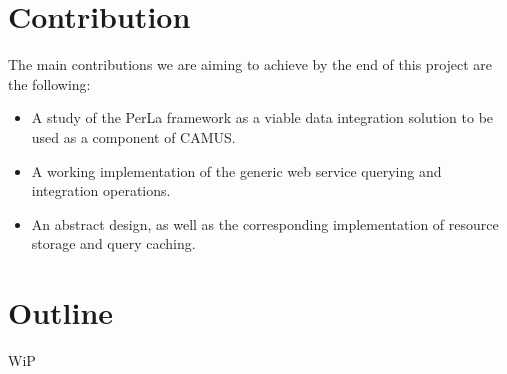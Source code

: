 \section{Contribution}
The main contributions we are aiming to achieve by the end of this project are the following:
\begin{itemize}
\item A study of the PerLa framework as a viable data integration solution to be used as a component of CAMUS.
\item A working implementation of the generic web service querying and integration operations.
\item An abstract design, as well as the corresponding implementation of resource storage and query caching.
\end{itemize}

\section{Outline}
WiP
